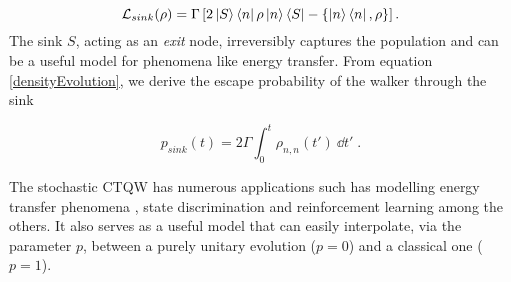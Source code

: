 \documentclass[main.tex]{subfiles}
\begin{document}

\begin{equation}
    \mathcal{L}_{sink} (\rho) = \Gamma \left [ 2\ket{S}\bra{n}\rho \ket{n} \bra{S} - \{\ket{n}\bra{n}, \rho\} \right ].
\end{equation}
The sink \(S\), acting as an \emph{exit} node, irreversibly captures the
population and can be a useful model for phenomena like energy transfer. From
equation \eqref{densityEvolution}, we derive the escape probability of the walker
through the sink



\begin{equation}
    p_{sink}(t) = 2 \Gamma \int_0^t \rho_{n,n}(t') \ \dd t' \; .
\end{equation}


The stochastic CTQW has numerous applications such has modelling energy
transfer phenomena \cite{Caruso2009}, state discrimination \cite{Pozza2020} and
reinforcement learning \cite{Pozza2022,Buffoni2020} among the others. It also
serves as a useful model that can easily interpolate, via the parameter $p$,
between a purely unitary evolution ($p=0$) and a classical one ($p=1$).


\end{document}
